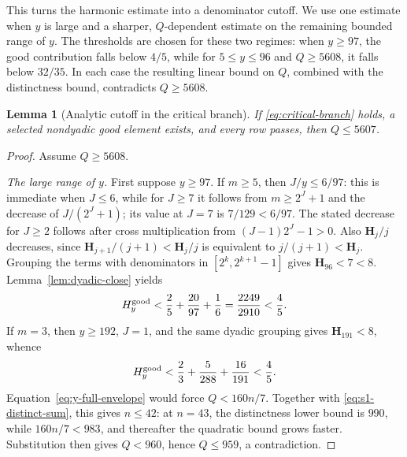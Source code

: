 \documentclass[11pt]{article}
\newtheorem{lemma}[theorem]{Lemma}
\theoremstyle{definition}
\theoremstyle{remark}
\newcommand{\Harm}{\mathbf H}
\begin{document}
This turns the harmonic estimate into a denominator cutoff.  We use one
estimate when \(y\) is large and a sharper, \(Q\)-dependent estimate on the
remaining bounded range of \(y\).  The thresholds are chosen for these two
regimes: when \(y\ge97\), the good contribution falls below \(4/5\), while
for \(5\le y\le96\) and \(Q\ge5608\), it falls below \(32/35\).  In each
case the resulting linear bound on \(Q\), combined with the distinctness
bound, contradicts \(Q\ge5608\).

\begin{lemma}[Analytic cutoff in the critical branch]
\label{lem:critical-cutoff}
If \eqref{eq:critical-branch} holds, a selected nondyadic good element
exists, and every row passes, then \(Q\le5607\).
\end{lemma}

\begin{proof}
Assume \(Q\ge5608\).

\smallskip
\noindent\emph{The large range of \(y\).}
First suppose \(y\ge97\).  If \(m\ge5\), then
\(J/y\le6/97\): this is immediate when \(J\le6\), while for
\(J\ge7\) it follows from \(m\ge2^J+1\) and the decrease of
\(J/(2^J+1)\); its value at \(J=7\) is \(7/129<6/97\).
The stated decrease for \(J\ge2\) follows after cross multiplication from
\((J-1)2^J-1>0\).
Also \(\Harm_j/j\) decreases, since
\(\Harm_{j+1}/(j+1)<\Harm_j/j\) is equivalent to
\(j/(j+1)<\Harm_j\).  Grouping the terms with denominators in
\([2^k,2^{k+1}-1]\) gives \(\Harm_{96}<7<8\).
Lemma~\ref{lem:dyadic-close} yields
\[
 H_y^{\rm good}<\frac25+\frac{20}{97}+\frac16
 =\frac{2249}{2910}<\frac45.
\]
If \(m=3\), then \(y\ge192\), \(J=1\), and the same dyadic grouping
gives \(\Harm_{191}<8\), whence
\[
 H_y^{\rm good}<\frac23+\frac5{288}+\frac{16}{191}<\frac45.
\]
Equation~\eqref{eq:y-full-envelope} would force
\(Q<160n/7\).  Together with \eqref{eq:s1-distinct-sum}, this gives
\(n\le42\): at \(n=43\), the distinctness lower bound is \(990\),
while \(160n/7<983\), and thereafter the quadratic bound grows faster.
Substitution then gives \(Q<960\), hence \(Q\le959\), a contradiction.


\end{proof}
\end{document}
